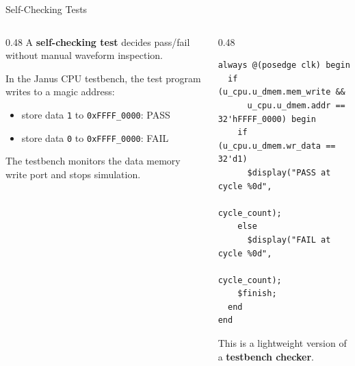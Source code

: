 \documentclass[aspectratio=169,10pt]{beamer}
\begin{document}
\begin{frame}[fragile]{Self-Checking Tests}
  \begin{columns}[T]
    \begin{column}{0.48\textwidth}
      A \textbf{self-checking test} decides pass/fail without manual waveform inspection.

      \vspace{0.7em}
      In the Janus CPU testbench, the test program writes to a magic address:
      \begin{itemize}
        \item store data \texttt{1} to \texttt{0xFFFF\_0000}: PASS
        \item store data \texttt{0} to \texttt{0xFFFF\_0000}: FAIL
      \end{itemize}

      \vspace{0.7em}
      The testbench monitors the data memory write port and stops simulation.
    \end{column}
    \begin{column}{0.48\textwidth}
\begin{lstlisting}
always @(posedge clk) begin
  if (u_cpu.u_dmem.mem_write &&
      u_cpu.u_dmem.addr == 32'hFFFF_0000) begin
    if (u_cpu.u_dmem.wr_data == 32'd1)
      $display("PASS at cycle %0d",
               cycle_count);
    else
      $display("FAIL at cycle %0d",
               cycle_count);
    $finish;
  end
end
\end{lstlisting}
      \vspace{0.4em}
      \small
      This is a lightweight version of a \textbf{testbench checker}.
    \end{column}
  \end{columns}
\end{frame}
\end{document}
